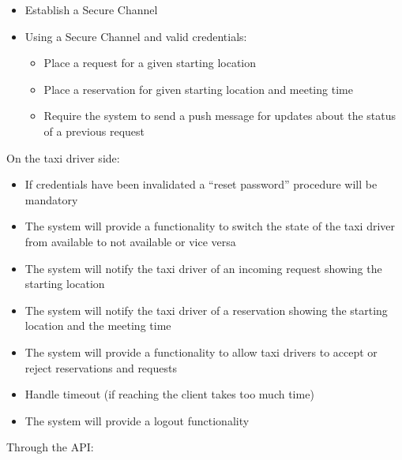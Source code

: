 \documentclass{article}
\begin{document}
\begin{itemize}
\begin{itemize}
			\item Establish a Secure Channel 
			\item Using a Secure Channel and valid credentials:\@
				\begin{itemize}
					\item Place a request for a given starting location
					\item Place a reservation for given starting location and meeting time
					\item Require the system to send a push message for updates about the status of a previous request
				\end{itemize}
		\end{itemize}
\end{itemize}
On the taxi driver side:\@ %
\begin{itemize}
	\item If credentials have been invalidated a ``reset password'' procedure will be mandatory %
	\item The system will provide a functionality to switch the state of the taxi driver from available to not available or vice versa
	\item The system will notify the taxi driver of an incoming request showing the starting location
	\item The system will notify the taxi driver of a reservation showing the starting location and the meeting time
	\item The system will provide a functionality to allow taxi drivers to accept or reject reservations and requests
	\item Handle timeout (if reaching the client takes too much time) %
	\item The system will provide a logout functionality
\end{itemize}
Through the API:\@ %
\end{document}
